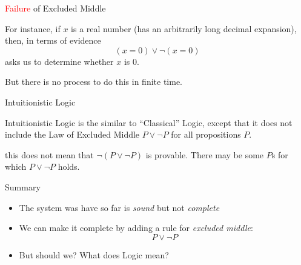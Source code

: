 \documentclass[xetex,aspectratio=169,14pt,hyperref={pdfpagelabels=true,pdflang={en-GB}}]{beamer}
\begin{document}
\begin{frame}
  {\textcolor{red}{Failure} of Excluded Middle}

  For instance, if $x$ is a real number (has an arbitrarily long
  decimal expansion), then, in terms of evidence
  \begin{displaymath}
    (x = 0) \lor \lnot (x = 0)
  \end{displaymath}
  asks us to determine whether $x$ is $0$.

  \medskip

  But there is no process to do this in finite time.\\
\end{frame}

\begin{frame}
  {Intuitionistic Logic}

  Intuitionistic Logic is the similar to ``Classical'' Logic, except
  that it does not include the Law of Excluded Middle $P \lor \lnot P$
  for all propositions $P$.

  \medskip

   this does not mean that $\lnot (P \lor \lnot P)$ is
  provable. There may be some $P$s for which $P \lor \lnot P$ holds.\\
\end{frame}

\begin{frame}
  {Summary}

  \begin{itemize}
  \item The system was have so far is \emph{sound} but not \emph{complete}
  \item We can make it complete by adding a rule for \emph{excluded middle}:
    \begin{displaymath}
      P \lor \lnot P
    \end{displaymath}
  \item But should we? What does Logic mean?
  \end{itemize}
\end{frame}
\end{document}
